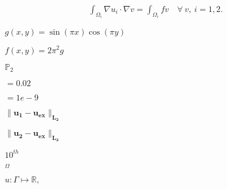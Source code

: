 \documentclass{article}
\begin{document}
\begin{equation*} \begin{aligned} \int_{\Omega_i} \nabla u_i \cdot \nabla v = \int_{\Omega_i} fv \quad \forall~ v,~i=1,2. \end{aligned} \end{equation*}
\pagebreak

$ g(x,y) = \sin(\pi x)\cos(\pi y)$
\pagebreak

$f(x,y) = 2\pi^2g$
\pagebreak

$\mathbb P_2$
\pagebreak

$= 0.02$
\pagebreak

$=1e-9$
\pagebreak

$\mathbf {\| u_1-u_{ex}\|_{L_2} }$
\pagebreak

$\mathbf{\| u_2-u_{ex}\|_{L_2}}$
\pagebreak

$ 10^{th}$
\pagebreak

$_{\Omega}$
\pagebreak

$u: \Gamma \longmapsto \mathbb R, $
\pagebreak
\end{document}
